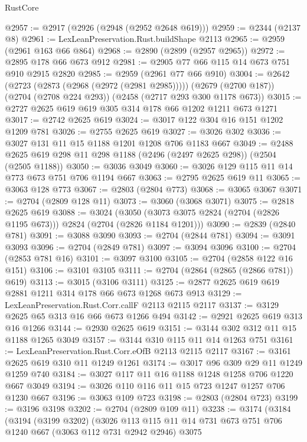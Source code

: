 \begin{lexlean}{RustCore}
\begin{coremodule}
@2957 := @2917 (@2926 (@2948 (@2952 @2648 @619)))
@2959 := @2344 (@2137 @8)
@2961 := LexLeanPreservation.Rust.buildShape @2113
@2965 := @2959 (@2961 @163 @66 @864)
@2968 := @2890 (@2899 (@2957 @2965))
@2972 := @2895 @178 @66 @673 @912
@2981 := @2905 @77 @66 @115 @14 @673 @751 @910 @2915 @2820
@2985 := @2959 (@2961 @77 @66 @910)
@3004 := @2642
    (@2723 (@2873 (@2968 (@2972 (@2981 @2985)))))
    (@2679 (@2700 @187))
    (@2704 (@2708 @224 @293))
    (@2458 (@2717 @293 @300 @1178 @673))
@3015 := @2727 @2625 @619 @619 @305 @314 @178 @66 @1202 @1211 @673 @1271
@3017 := @2742 @2625 @619
@3024 := @3017 @122 @304 @16 @151 @1202 @1209 @781
@3026 := @2755 @2625 @619
@3027 := @3026 @302
@3036 := @3027 @131 @11 @15 @1188 @1201 @1208 @706 @1183 @667
@3049 := @2488 @2625 @619 @298 @11 @298 @1188 (@2496 (@2497 @2625 @298)) (@2504 (@2505 @1188))
@3050 := @3036 @3049
@3060 := @3026 @129 @115 @11 @14 @773 @673 @751 @706 @1194 @667
@3063 := @2795 @2625 @619 @11
@3065 := @3063 @128 @773
@3067 := @2803 (@2804 @773)
@3068 := @3065 @3067
@3071 := @2704 (@2809 @128 @11)
@3073 := @3060 (@3068 @3071)
@3075 := @2818 @2625 @619
@3088 := @3024
    (@3050 (@3073 @3075 @2824 (@2704 (@2826 @1195 @673))) @2824 (@2704 (@2826 @1184 @1201)))
@3090 := @2839 (@2840 @781)
@3091 := @3088 @3090
@3093 := @2704 (@2844 @781)
@3094 := @3091 @3093
@3096 := @2704 (@2849 @781)
@3097 := @3094 @3096
@3100 := @2704 (@2853 @781 @16)
@3101 := @3097 @3100
@3105 := @2704 (@2858 @122 @16 @151)
@3106 := @3101 @3105
@3111 := @2704 (@2864 (@2865 (@2866 @781)) @619)
@3113 := @3015 (@3106 @3111)
@3125 := @2877 @2625 @619 @619 @2881 @1211 @314 @178 @66 @673 @1268 @673 @913
@3129 := LexLeanPreservation.Rust.Corr.callF @2113 @2115 @2117
@3137 := @3129 @2625 @65 @313 @16 @66 @673 @1266 @494
@3142 := @2921 @2625 @619 @313 @16 @1266
@3144 := @2930 @2625 @619
@3151 := @3144 @302 @312 @11 @15 @1188 @1265 @3049
@3157 := @3144 @310 @115 @11 @14 @1263 @751
@3161 := LexLeanPreservation.Rust.Corr.eOfB @2113 @2115 @2117
@3167 := @3161 @2625 @619 @310 @11 @1249 @1261
@3174 := @3017 @96 @309 @29 @11 @1249 @1259 @740
@3184 := @3027 @117 @11 @16 @1188 @1248 @1258 @706 @1220 @667 @3049
@3194 := @3026 @110 @116 @11 @15 @723 @1247 @1257 @706 @1230 @667
@3196 := @3063 @109 @723
@3198 := @2803 (@2804 @723)
@3199 := @3196 @3198
@3202 := @2704 (@2809 @109 @11)
@3238 := @3174
    (@3184
      (@3194
        (@3199 @3202)
        (@3026
          @113
          @115
          @11
          @14
          @731
          @673
          @751
          @706
          @1240
          @667
          (@3063 @112 @731 @2942 @2946)
          @3075

\end{coremodule}
\end{lexlean}
